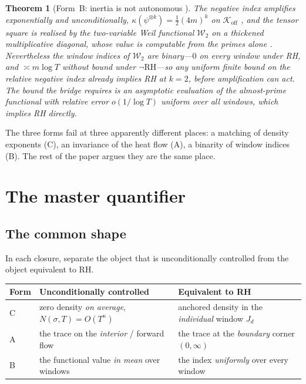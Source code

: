 \documentclass[11pt]{amsart}
\newtheorem{theorem}{Theorem}[section]
\theoremstyle{definition}
\theoremstyle{remark}
\newcommand{\RH}{\mathrm{RH}}
\newcommand{\Koff}{\mathcal{K}_{\mathrm{off}}}
\newcommand{\Wtwo}{\mathcal{W}_2}
\begin{document}
\begin{theorem}[Form~B: inertia is not autonomous {\cite[]{P40}}]
\label{thm:B}
The negative index amplifies exponentially and unconditionally,
$\kappa(\psi^{\otimes k})=\tfrac12(4m)^k$ on $\Koff$
\cite[]{P40}, and the tensor square is realised by the two-variable
Weil functional $\Wtwo$ on a thickened multiplicative diagonal, whose value
is computable from the primes alone \cite[]{P40}. Nevertheless the
window indices of $\Wtwo$ are binary---$0$ on every window under RH, and
$\asymp m\log T$ without bound under $\neg\RH$---so any uniform finite bound
on the relative negative index already implies RH at $k=2$, before
amplification can act. The bound the bridge requires is an asymptotic
evaluation of the almost-prime functional with relative error $o(1/\log T)$
uniform over all windows, which implies RH directly.
\end{theorem}

The three forms fail at three apparently different places: a matching of
density exponents (C), an invariance of the heat flow (A), a binarity of
window indices (B). The rest of the paper argues they are the same place.

\section{The master quantifier}\label{sec:master}

\subsection{The common shape}
In each closure, separate the object that is unconditionally controlled from
the object equivalent to RH.

\begin{center}
\renewcommand{\arraystretch}{1.45}
\begin{tabular}{lll}
\textbf{Form} & \textbf{Unconditionally controlled} & \textbf{Equivalent to RH}\\
\hline
C & zero density \emph{on average}, $N(\sigma,T)=O(T^{\kappa})$ & anchored density in the \emph{individual} window $J_d$\\
A & the trace on the \emph{interior} / forward flow & the trace at the \emph{boundary} corner $(0,\infty)$\\
B & the functional value \emph{in mean} over windows & the index \emph{uniformly} over every window\\
\end{tabular}
\end{center}
\end{document}
